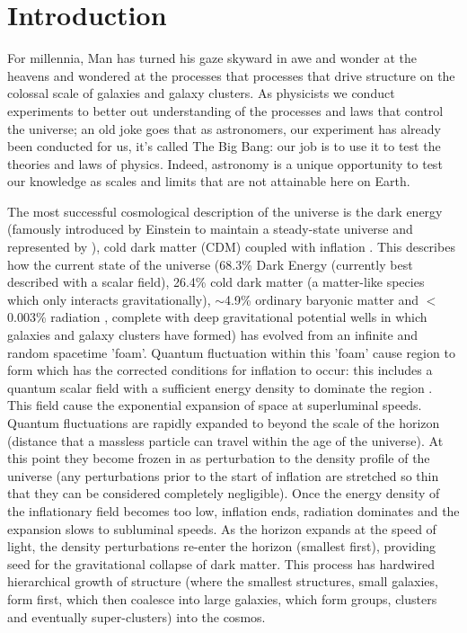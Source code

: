 \chapter{Introduction}
	\label{cha:intro}
For millennia, Man has turned his gaze skyward in awe and wonder at the heavens and wondered at the processes that processes that drive structure on the colossal scale of galaxies and galaxy clusters. As physicists we conduct experiments to better out understanding of the processes and laws that control the universe; an old joke goes that as astronomers, our experiment has already been conducted for us, it's called The Big Bang: our job is to use it to test the theories and laws of physics. Indeed, astronomy is a unique opportunity to test our knowledge as scales and limits that are not attainable here on Earth.

The most successful cosmological description of the universe is the dark energy (famously introduced by Einstein to maintain a steady-state universe and represented by \textLambda), cold dark matter ({\textLambda}CDM) \citep{Peebles1982, Bond1982, Blumenthal1982, Blumenthal1984} coupled with inflation \citep{Guth1981}. This describes how the current state of the universe (68.3\% Dark Energy (currently best described with a scalar field), 26.4\% cold dark matter (a matter-like species which only interacts gravitationally), $\sim$4.9\% ordinary baryonic matter and $<$0.003\% radiation \citep{PlanckCollaboration2016}, complete with deep gravitational potential wells in which galaxies and galaxy clusters have formed) has evolved from an infinite and random spacetime 'foam'. Quantum fluctuation within this 'foam' cause region to form which has the corrected conditions for inflation to occur: this includes a quantum scalar field with a sufficient energy density to dominate the region \citep{Linde1982, Albrecht1982}. This field cause the exponential expansion of space at superluminal speeds. Quantum fluctuations are rapidly expanded to beyond the scale of the horizon (distance that a massless particle can travel within the age of the universe). At this point they become frozen in as perturbation to the density profile of the universe (any perturbations prior to the start of inflation are stretched so thin that they can be considered completely negligible). Once the energy density of the inflationary field becomes too low, inflation ends, radiation dominates and the expansion slows to subluminal speeds. As the horizon expands at the speed of light, the density perturbations re-enter the horizon (smallest first), providing seed for the gravitational collapse of dark matter. This process has hardwired hierarchical growth of structure (where the smallest structures, small galaxies, form first, which then coalesce into large galaxies, which form groups, clusters and eventually super-clusters) into the cosmos. 

